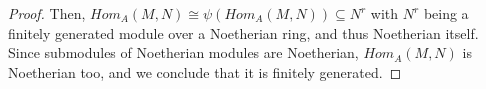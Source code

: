 \begin{problem}
\begin{enumerate}[label=(\theproblem.\arabic*),ref=\theproblem.\arabic*]
\begin{sol}
\begin{proof}
                    Then, $Hom_A(M,N) \cong \psi(Hom_A(M,N)) \subseteq N^r$ with $N^r$
                    being a finitely generated module over a Noetherian ring, and thus Noetherian itself.
                    Since submodules of Noetherian modules are Noetherian, $Hom_A(M,N)$ is Noetherian too,
                    and we conclude that it is finitely generated.

                \end{proof}
            \end{sol}
    \end{enumerate}
\end{problem}